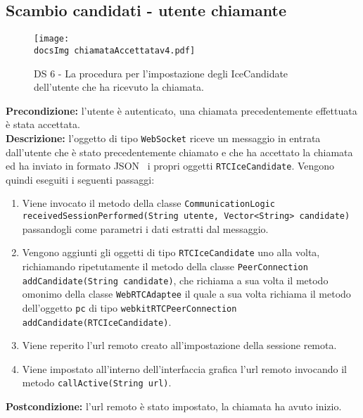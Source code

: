 \begin{sloppypar}
\newpage

\subsection{Scambio candidati - utente chiamante}
\begin{center}
				\begin{figure}[h!tbp]
					\centering
					\texttt{[image: \\docsImg  chiamataAccettatav4.pdf]}
				\caption{DS 6 - La procedura per l'impostazione degli IceCandidate dell'utente che ha ricevuto la chiamata.}	
				\end{figure}
			\end{center}
\noindent \textbf{Precondizione: }l'utente è autenticato, una chiamata precedentemente effettuata è stata accettata.\\
\textbf{Descrizione: }l'oggetto di tipo \texttt{WebSocket} riceve un messaggio in entrata dall'utente che è stato precedentemente chiamato e che ha accettato la chiamata ed ha inviato in formato JSON\g~ i propri oggetti  \texttt{RTCIceCandidate}. Vengono quindi eseguiti i seguenti passaggi:
\begin{enumerate}
	\item Viene invocato il metodo della classe \texttt{CommunicationLogic receivedSessionPerformed(String utente, Vector<String> candidate)} passandogli come parametri i dati estratti dal messaggio.
	\item Vengono aggiunti gli oggetti di tipo \texttt{RTCIceCandidate} uno alla volta, richiamando ripetutamente il metodo della classe \texttt{PeerConnection addCandidate(String candidate)}, che richiama a sua volta il metodo omonimo della classe \texttt{WebRTCAdaptee} il quale a sua volta richiama il metodo dell'oggetto \texttt{pc} di tipo \texttt{webkitRTCPeerConnection addCandidate(RTCIceCandidate)}.
	\item Viene reperito l'url remoto creato all'impostazione della sessione remota.
	\item Viene impostato all'interno dell'interfaccia grafica l'url remoto invocando il metodo \texttt{callActive(String url)}.
\end{enumerate}
\textbf{Postcondizione: } l'url remoto è stato impostato, la chiamata ha avuto inizio.

\end{sloppypar}